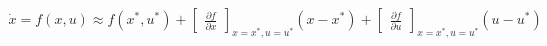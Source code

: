 \documentclass[preview]{standalone}
\begin{document}
\begin{align*}
\dot{x} = {f}(x,u) \approx {f}(x^*,u^*) + \begin{bmatrix} \frac{\partial f}{\partial x}\end{bmatrix}_{x=x^*,u=u^*} (x - x^*) + \begin{bmatrix} \frac {\partial f}{\partial u}\end{bmatrix}_{x=x^*,u=u^*} (u - u^*)
\end{align*}
\end{document}
